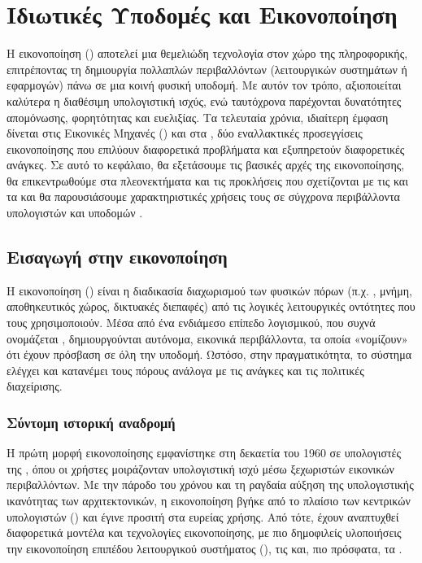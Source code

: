 
\chapter{Ιδιωτικές Υποδομές και Εικονοποίηση}\label{ch:private_cloud_and_virtualization}

Η εικονοποίηση () αποτελεί μια θεμελιώδη τεχνολογία στον χώρο της πληροφορικής, επιτρέποντας τη δημιουργία πολλαπλών περιβαλλόντων (λειτουργικών συστημάτων ή εφαρμογών) πάνω σε μια κοινή φυσική υποδομή. Με αυτόν τον τρόπο, αξιοποιείται καλύτερα η διαθέσιμη υπολογιστική ισχύς, ενώ ταυτόχρονα παρέχονται δυνατότητες απομόνωσης, φορητότητας και ευελιξίας. Τα τελευταία χρόνια, ιδιαίτερη έμφαση δίνεται στις Εικονικές Μηχανές () και στα , δύο εναλλακτικές προσεγγίσεις εικονοποίησης που επιλύουν διαφορετικά προβλήματα και εξυπηρετούν διαφορετικές ανάγκες. Σε αυτό το κεφάλαιο, θα εξετάσουμε τις βασικές αρχές της εικονοποίησης, θα επικεντρωθούμε στα πλεονεκτήματα και τις προκλήσεις που σχετίζονται με τις  και τα  και θα παρουσιάσουμε χαρακτηριστικές χρήσεις τους σε σύγχρονα περιβάλλοντα υπολογιστών και υποδομών .

\section{Εισαγωγή στην εικονοποίηση}

Η εικονοποίηση () είναι η διαδικασία διαχωρισμού των φυσικών πόρων (π.χ. , μνήμη, αποθηκευτικός χώρος, δικτυακές διεπαφές) από τις λογικές λειτουργικές οντότητες που τους χρησιμοποιούν. Μέσα από ένα ενδιάμεσο επίπεδο λογισμικού, που συχνά ονομάζεται , δημιουργούνται αυτόνομα, εικονικά περιβάλλοντα, τα οποία «νομίζουν» ότι έχουν πρόσβαση σε όλη την υποδομή. Ωστόσο, στην πραγματικότητα, το σύστημα ελέγχει και κατανέμει τους πόρους ανάλογα με τις ανάγκες και τις πολιτικές διαχείρισης.

\subsection{Σύντομη ιστορική αναδρομή}

Η πρώτη μορφή εικονοποίησης εμφανίστηκε στη δεκαετία του 1960 σε υπολογιστές  της , όπου οι χρήστες μοιράζονταν υπολογιστική ισχύ μέσω ξεχωριστών εικονικών περιβαλλόντων. Με την πάροδο του χρόνου και τη ραγδαία αύξηση της υπολογιστικής ικανότητας των  αρχιτεκτονικών, η εικονοποίηση βγήκε από το πλαίσιο των κεντρικών υπολογιστών () και έγινε προσιτή στα  ευρείας χρήσης. Από τότε, έχουν αναπτυχθεί διαφορετικά μοντέλα και τεχνολογίες εικονοποίησης, με πιο δημοφιλείς υλοποιήσεις την εικονοποίηση επιπέδου λειτουργικού συστήματος (), τις  και, πιο πρόσφατα, τα .

